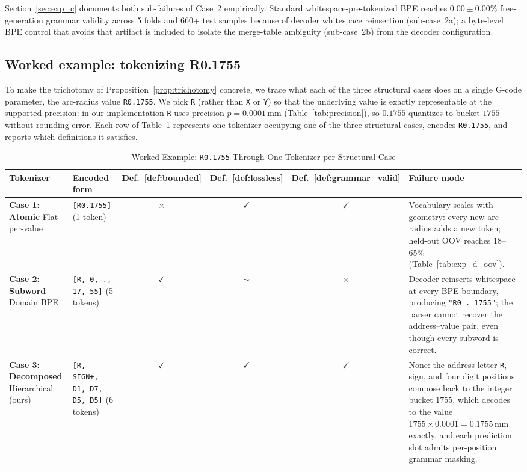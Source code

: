 \documentclass[11pt]{article}
\begin{document}
Section~\ref{sec:exp_c} documents both sub-failures of Case~2 empirically. Standard whitespace-pre-tokenized BPE reaches $0.00 \pm 0.00\%$ free-generation grammar validity across 5 folds and 660+ test samples because of decoder whitespace reinsertion (sub-case~2a); a byte-level BPE control that avoids that artifact is included to isolate the merge-table ambiguity (sub-case~2b) from the decoder configuration.

\subsection{Worked example: tokenizing R0.1755}
\label{sec:worked_example}

To make the trichotomy of Proposition~\ref{prop:trichotomy} concrete, we trace what each of the three structural cases does on a single G-code parameter, the arc-radius value \texttt{R0.1755}. We pick \texttt{R} (rather than \texttt{X} or \texttt{Y}) so that the underlying value is exactly representable at the supported precision: in our implementation \texttt{R} uses precision $p = 0.0001\,$mm (Table~\ref{tab:precision}), so $0.1755$ quantizes to bucket $1755$ without rounding error. Each row of Table~\ref{tab:worked_example} represents one tokenizer occupying one of the three structural cases, encodes \texttt{R0.1755}, and reports which definitions it satisfies.

\begin{table}[htbp]
\centering
\caption{Worked Example: \texttt{R0.1755} Through One Tokenizer per Structural Case}
\label{tab:worked_example}
\small
\begin{tabular}{@{}p{2.6cm}p{4.4cm}cccp{3.0cm}@{}}
\toprule
\textbf{Tokenizer} & \textbf{Encoded form} & \textbf{Def.~\ref{def:bounded}} & \textbf{Def.~\ref{def:lossless}} & \textbf{Def.~\ref{def:grammar_valid}} & \textbf{Failure mode} \\
\midrule
\textbf{Case 1: Atomic} \newline Flat per-value &
\texttt{[R0.1755]} (1 token) &
$\times$ & $\checkmark$ & $\checkmark$ &
Vocabulary scales with geometry: every new arc radius adds a new token; held-out OOV reaches 18--65\% (Table~\ref{tab:exp_d_oov}). \\
\addlinespace
\textbf{Case 2: Subword} \newline Domain BPE &
\texttt{[R, 0, ., 17, 55]} (5 tokens) &
$\checkmark$ & $\sim$ & $\times$ &
Decoder reinserts whitespace at every BPE boundary, producing \texttt{"R0 . 1755"}; the parser cannot recover the address--value pair, even though every subword is correct. \\
\addlinespace
\textbf{Case 3: Decomposed} \newline Hierarchical (ours) &
\texttt{[R, SIGN+, D1, D7, D5, D5]} (6 tokens) &
$\checkmark$ & $\checkmark$ & $\checkmark$ &
None: the address letter \texttt{R}, sign, and four digit positions compose back to the integer bucket $1755$, which decodes to the value $1755 \times 0.0001 = 0.1755\,$mm exactly, and each prediction slot admits per-position grammar masking. \\
\bottomrule
\end{tabular}
\end{table}
\end{document}
